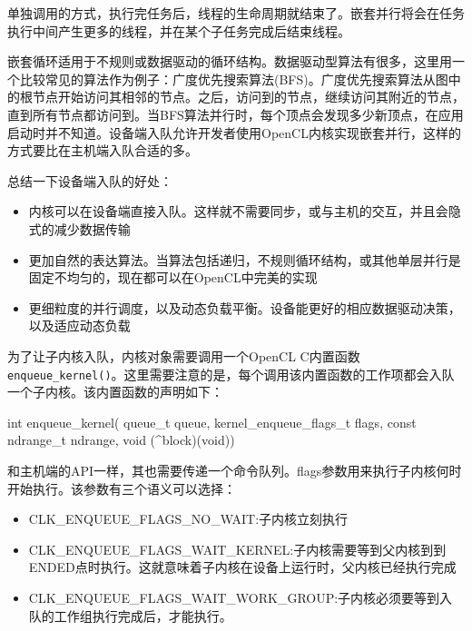 
单独调用的方式，执行完任务后，线程的生命周期就结束了。嵌套并行将会在任务执行中间产生更多的线程，并在某个子任务完成后结束线程。

嵌套循环适用于不规则或数据驱动的循环结构。数据驱动型算法有很多，这里用一个比较常见的算法作为例子：广度优先搜索算法(BFS)。广度优先搜索算法从图中的根节点开始访问其相邻的节点。之后，访问到的节点，继续访问其附近的节点，直到所有节点都访问到。当BFS算法并行时，每个顶点会发现多少新顶点，在应用启动时并不知道。设备端入队允许开发者使用OpenCL内核实现嵌套并行，这样的方式要比在主机端入队合适的多。

总结一下设备端入队的好处：

\begin{itemize}
\item 内核可以在设备端直接入队。这样就不需要同步，或与主机的交互，并且会隐式的减少数据传输
\item 更加自然的表达算法。当算法包括递归，不规则循环结构，或其他单层并行是固定不均匀的，现在都可以在OpenCL中完美的实现
\item 更细粒度的并行调度，以及动态负载平衡。设备能更好的相应数据驱动决策，以及适应动态负载
\end{itemize}

为了让子内核入队，内核对象需要调用一个OpenCL C内置函数\texttt{enqueue\_kernel()}。这里需要注意的是，每个调用该内置函数的工作项都会入队一个子内核。该内置函数的声明如下：

\begin{codebox}[cpp]
int
enqueue_kernel(
  queue_t queue,
  kernel_enqueue_flags_t flags,
  const ndrange_t ndrange,
  void (^block)(void))
\end{codebox}

和主机端的API一样，其也需要传递一个命令队列。flags参数用来执行子内核何时开始执行。该参数有三个语义可以选择：

\begin{itemize}
\item CLK\_\allowbreak{}ENQUEUE\_\allowbreak{}FLAGS\_\allowbreak{}NO\_\allowbreak{}WAIT:子内核立刻执行
\item CLK\_\allowbreak{}ENQUEUE\_\allowbreak{}FLAGS\_\allowbreak{}WAIT\_\allowbreak{}KERNEL:子内核需要等到父内核到到ENDED点时执行。这就意味着子内核在设备上运行时，父内核已经执行完成
\item CLK\_\allowbreak{}ENQUEUE\_\allowbreak{}FLAGS\_\allowbreak{}WAIT\_\allowbreak{}WORK\_\allowbreak{}GROUP:子内核必须要等到入队的工作组执行完成后，才能执行。
\end{itemize}


